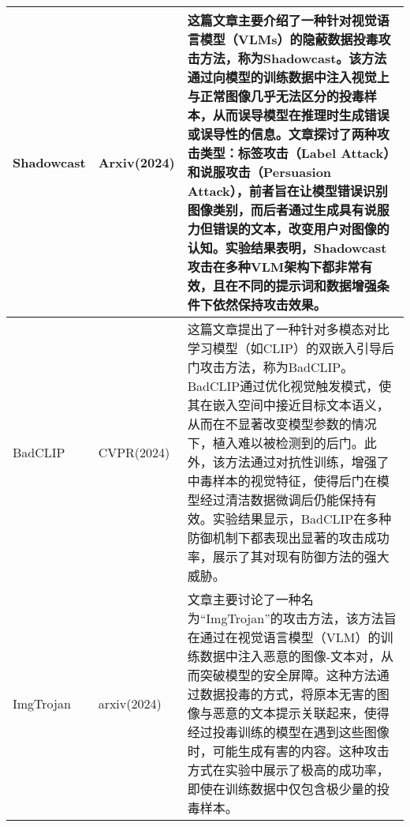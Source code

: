 \documentclass[lettersize,journal]{IEEEtran}
\begin{document}
\begin{longtable}{|p{3.5cm}|p{2cm}|p{10.5cm}|}
   Shadowcast\cite{xu2024shadowcast} & Arxiv(2024) & 这篇文章主要介绍了一种针对视觉语言模型（VLMs）的隐蔽数据投毒攻击方法，称为Shadowcast。该方法通过向模型的训练数据中注入视觉上与正常图像几乎无法区分的投毒样本，从而误导模型在推理时生成错误或误导性的信息。文章探讨了两种攻击类型：标签攻击（Label Attack）和说服攻击（Persuasion Attack），前者旨在让模型错误识别图像类别，而后者通过生成具有说服力但错误的文本，改变用户对图像的认知。实验结果表明，Shadowcast攻击在多种VLM架构下都非常有效，且在不同的提示词和数据增强条件下依然保持攻击效果。\\ \hline
   BadCLIP\cite{liang2024badclip} & CVPR(2024) & 这篇文章提出了一种针对多模态对比学习模型（如CLIP）的双嵌入引导后门攻击方法，称为BadCLIP。BadCLIP通过优化视觉触发模式，使其在嵌入空间中接近目标文本语义，从而在不显著改变模型参数的情况下，植入难以被检测到的后门。此外，该方法通过对抗性训练，增强了中毒样本的视觉特征，使得后门在模型经过清洁数据微调后仍能保持有效。实验结果显示，BadCLIP在多种防御机制下都表现出显著的攻击成功率，展示了其对现有防御方法的强大威胁。\\ \hline
   ImgTrojan\cite{tao2024imgtrojan} & arxiv(2024) & 文章主要讨论了一种名为“ImgTrojan”的攻击方法，该方法旨在通过在视觉语言模型（VLM）的训练数据中注入恶意的图像-文本对，从而突破模型的安全屏障。这种方法通过数据投毒的方式，将原本无害的图像与恶意的文本提示关联起来，使得经过投毒训练的模型在遇到这些图像时，可能生成有害的内容。这种攻击方式在实验中展示了极高的成功率，即使在训练数据中仅包含极少量的投毒样本。 \\ \hline

\end{longtable}
\end{document}

